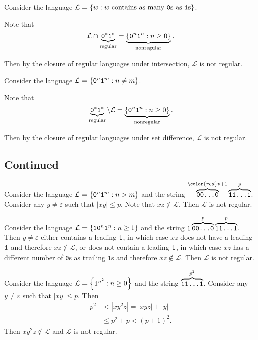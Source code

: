 \documentclass{notes}
\begin{document}
\begin{eg}
  Consider the language $\mathcal L = \left \{ w : \text{$w$ contains as many \verb~0~s as \verb~1~s} \right \}$.
  
  Note that 
  \[
    \mathcal L \cap \underbrace{\verb~0~^* \verb~1~^*}_\text{regular} = \underbrace{\left \{ \verb~0~^n \verb~1~^n : n \geq 0 \right \}}_\text{nonregular}.
  \]
  
  Then by the closure of regular languages under intersection, $\mathcal L$ is not regular.
\end{eg}

\begin{eg}
  Consider the language $\mathcal L = \left \{ \verb~0~^n \verb~1~^m : n \neq m \right \}$.

  Note that 
  \[
    \underbrace{\verb~0~^* \verb~1~^*}_\text{regular} \setminus \mathcal L = \underbrace{\left \{ \verb~0~^n \verb~1~^n : n \geq 0 \right \}}_\text{nonregular}.
  \]
  
  Then by the closure of regular languages under set difference, $\mathcal L$ is not regular.
\end{eg}

\subsection{Continued}

\begin{eg}
  Consider the language $\mathcal L = \left \{ \verb~0~^n \verb~1~^m : n > m \right \}$ and the string $\overbrace{\verb~00...0~}^{{\color{red} p + 1}} \overbrace{\verb~11...1~}^{p}$.
  Consider any $y \neq \varepsilon$ such that $\left | x y \right | \leq p$.
  Note that $x z \not \in \mathcal L$.
  Then $\mathcal L$ is not regular.
\end{eg}

\begin{eg}
  Consider the language $\mathcal L = \left \{ \verb~10~^n \verb~1~^n : n \geq 1 \right \}$ and the string $\verb~1~ \overbrace{\verb~00...0~}^{p} \overbrace{\verb~11...1~}^{p}$.
  Then $y \neq \varepsilon$ either contains a leading $\verb~1~$, in which case $x z$ does not have a leading $\verb~1~$ and therefore $x z \not \in \mathcal L$, or does not contain a leading $\verb~1~$, in which case $x z$ has a different number of \verb~0~s as trailing \verb~1~s and therefore $x z \not \in \mathcal L$.
  Then $\mathcal L$ is not regular.
\end{eg}

\begin{eg}
  Consider the language $\mathcal L = \left \{ \verb~1~^{n^2} : n \geq 0 \right \}$ and the string $\overbrace{\verb~11...1~}^{p^2}$.
  Consider any $y \neq \varepsilon$ such that $\left | x y \right | \leq p$.
  Then 
  \begin{align*}
    p^2 &< \left | x y^2 z \right | = \left | x y z \right | + \left | y \right | \\ 
    &\leq p^2 + p < (p + 1)^2.
  \end{align*}
  Then $x y^2 z \not \in \mathcal L$ and $\mathcal L$ is not regular.
\end{eg}
\end{document}
